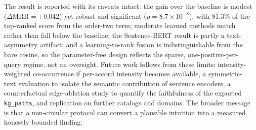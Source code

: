 \documentclass[conference]{IEEEtran}
\begin{document}
The result is reported with its caveats intact: the gain over the baseline is modest
($\Delta\mathrm{MRR}=+0.042$) yet robust and significant ($p=8.7\times10^{-8}$), with
$81.3\%$ of the top-ranked score from the order-two term; moderate learned methods match
rather than fall below the baseline; the Sentence-BERT result is partly a text-asymmetry
artifact; and a learning-to-rank fusion is indistinguishable from the bare cosine, so the
parameter-free design reflects the sparse, one-positive-per-query regime, not an oversight.
Future work follows from these limits: intensity-weighted co-occurrence if per-accord
intensity becomes available, a symmetric-text evaluation to isolate the semantic
contribution of sentence encoders, a counterfactual edge-ablation study to quantify the
faithfulness of the exported \texttt{kg\_paths}, and replication on further catalogs and
domains. The broader message is that a non-circular protocol can convert a plausible
intuition into a measured, honestly bounded finding.



\end{document}
